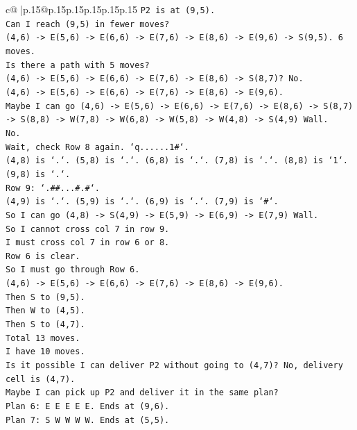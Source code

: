 \documentclass{article}
\begin{document}
{\begin{supertabular}{c@{$\;$}|p{.15\linewidth}@{}p{.15\linewidth}p{.15\linewidth}p{.15\linewidth}p{.15\linewidth}p{.15\linewidth}}
{{{\texttt{P2 is at (9,5).} \\
\texttt{Can I reach (9,5) in fewer moves?} \\
\texttt{(4,6) {-}> E(5,6) {-}> E(6,6) {-}> E(7,6) {-}> E(8,6) {-}> E(9,6) {-}> S(9,5). 6 moves.} \\
\texttt{Is there a path with 5 moves?} \\
\texttt{(4,6) {-}> E(5,6) {-}> E(6,6) {-}> E(7,6) {-}> E(8,6) {-}> S(8,7)? No.} \\
\texttt{(4,6) {-}> E(5,6) {-}> E(6,6) {-}> E(7,6) {-}> E(8,6) {-}> E(9,6).} \\
\texttt{Maybe I can go (4,6) {-}> E(5,6) {-}> E(6,6) {-}> E(7,6) {-}> E(8,6) {-}> S(8,7) {-}> S(8,8) {-}> W(7,8) {-}> W(6,8) {-}> W(5,8) {-}> W(4,8) {-}> S(4,9) Wall.} \\
\texttt{No.} \\
\texttt{Wait, check Row 8 again. `q......1\#`.} \\
\texttt{(4,8) is `.`. (5,8) is `.`. (6,8) is `.`. (7,8) is `.`. (8,8) is `1`. (9,8) is `.`.} \\
\texttt{Row 9: `.\#\#...\#.\#`.} \\
\texttt{(4,9) is `.`. (5,9) is `.`. (6,9) is `.`. (7,9) is `\#`.} \\
\texttt{So I can go (4,8) {-}> S(4,9) {-}> E(5,9) {-}> E(6,9) {-}> E(7,9) Wall.} \\
\texttt{So I cannot cross col 7 in row 9.} \\
\texttt{I must cross col 7 in row 6 or 8.} \\
\texttt{Row 6 is clear.} \\
\texttt{So I must go through Row 6.} \\
\texttt{(4,6) {-}> E(5,6) {-}> E(6,6) {-}> E(7,6) {-}> E(8,6) {-}> E(9,6).} \\
\texttt{Then S to (9,5).} \\
\texttt{Then W to (4,5).} \\
\texttt{Then S to (4,7).} \\
\texttt{Total 13 moves.} \\
\texttt{I have 10 moves.} \\
\texttt{Is it possible I can deliver P2 without going to (4,7)? No, delivery cell is (4,7).} \\
\texttt{Maybe I can pick up P2 and deliver it in the same plan?} \\
\texttt{Plan 6: E E E E E. Ends at (9,6).} \\
\texttt{Plan 7: S W W W W. Ends at (5,5).} \\
}}}
\end{supertabular}}
\end{document}
